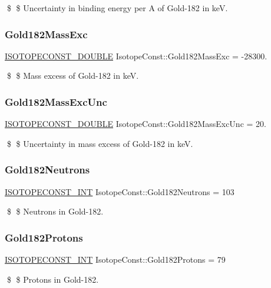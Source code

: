 \$ \$ Uncertainty in binding energy per A of Gold-\/182 in keV. \mbox{\label{group___isotope_const-_gold-_au182_ga11e42da450b82f17abd5ace290b9447c}} 
\subsubsection{\texorpdfstring{Gold182\+Mass\+Exc}{Gold182MassExc}}
{\footnotesize\ttfamily \mbox{\hyperlink{group___isotope_const-_macros_ga8f45a7272ce02c0b4c65c44636ed719a}{I\+S\+O\+T\+O\+P\+E\+C\+O\+N\+S\+T\+\_\+\+D\+O\+U\+B\+LE}} Isotope\+Const\+::\+Gold182\+Mass\+Exc = -\/28300.}

\$ \$ Mass excess of Gold-\/182 in keV. \mbox{\label{group___isotope_const-_gold-_au182_ga40cdf237288eabd8563372ff43f05308}} 
\subsubsection{\texorpdfstring{Gold182\+Mass\+Exc\+Unc}{Gold182MassExcUnc}}
{\footnotesize\ttfamily \mbox{\hyperlink{group___isotope_const-_macros_ga8f45a7272ce02c0b4c65c44636ed719a}{I\+S\+O\+T\+O\+P\+E\+C\+O\+N\+S\+T\+\_\+\+D\+O\+U\+B\+LE}} Isotope\+Const\+::\+Gold182\+Mass\+Exc\+Unc = 20.}

\$ \$ Uncertainty in mass excess of Gold-\/182 in keV. \mbox{\label{group___isotope_const-_gold-_au182_ga03509b624bb0a13622eec5938eb295ea}} 
\subsubsection{\texorpdfstring{Gold182\+Neutrons}{Gold182Neutrons}}
{\footnotesize\ttfamily \mbox{\hyperlink{group___isotope_const-_macros_ga5f18360b3e99483a35c32d789e62621c}{I\+S\+O\+T\+O\+P\+E\+C\+O\+N\+S\+T\+\_\+\+I\+NT}} Isotope\+Const\+::\+Gold182\+Neutrons = 103}

\$ \$ Neutrons in Gold-\/182. \mbox{\label{group___isotope_const-_gold-_au182_ga2bd9c005e8c7efbb8f420dd1db6f9f98}} 
\subsubsection{\texorpdfstring{Gold182\+Protons}{Gold182Protons}}
{\footnotesize\ttfamily \mbox{\hyperlink{group___isotope_const-_macros_ga5f18360b3e99483a35c32d789e62621c}{I\+S\+O\+T\+O\+P\+E\+C\+O\+N\+S\+T\+\_\+\+I\+NT}} Isotope\+Const\+::\+Gold182\+Protons = 79}

\$ \$ Protons in Gold-\/182. 